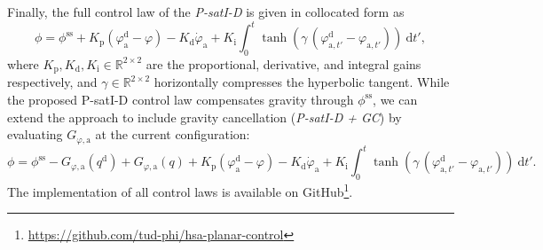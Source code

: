 % 
Finally, the full control law of the \emph{P-satI-D} is given in collocated form as
\begin{equation}\label{eq:hsacontrol:gravity_compensation_controller}
    \phi = \phi^\mathrm{ss} + K_\mathrm{p} (\varphi_\mathrm{a}^\mathrm{d} - \varphi) - K_\mathrm{d} \dot{\varphi}_\mathrm{a} + K_\mathrm{i} \int_0^t \tanh(\gamma \, ( \varphi_{\mathrm{a},t'}^\mathrm{d}-\varphi_{\mathrm{a},t'})) \: \mathrm{d} t',
\end{equation}
where $K_\mathrm{p}, K_\mathrm{d}, K_\mathrm{i} \in \mathbb{R}^{2 \times 2}$ are the proportional, derivative, and integral gains respectively, and $\gamma \in \mathbb{R}^{2 \times 2}$ horizontally compresses the hyperbolic tangent. While the proposed P-satI-D control law compensates gravity through $\phi^\mathrm{ss}$, we can extend the approach to include gravity cancellation (\emph{P-satI-D + GC}) by evaluating $G_{\varphi,\mathrm{a}}$ at the current configuration:
\begin{equation}\label{eq:hsacontrol:gravity_cancellation_controller}
    \phi = \phi^\mathrm{ss} - G_{\varphi,\mathrm{a}}(q^\mathrm{d}) + G_{\varphi,\mathrm{a}}(q) + K_\mathrm{p} (\varphi_\mathrm{a}^\mathrm{d} - \varphi) - K_\mathrm{d} \dot{\varphi}_\mathrm{a} + K_\mathrm{i} \int_0^t \tanh(\gamma \, ( \varphi_{\mathrm{a},t'}^\mathrm{d}-\varphi_{\mathrm{a},t'})) \: \mathrm{d} t'.
\end{equation}
The implementation of all control laws is available on GitHub\footnote{\url{https://github.com/tud-phi/hsa-planar-control}}.

